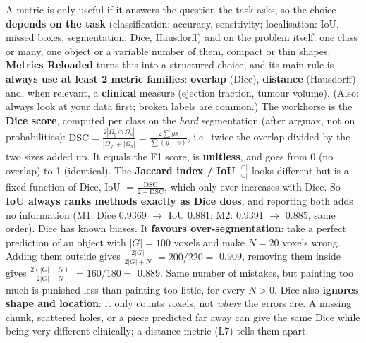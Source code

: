 \documentclass[a4paper]{article}
\newcommand{\K}[1]{\textcolor{kg}{\textbf{#1}}}
\newcommand{\F}[1]{\textcolor{fb}{#1}}
\newcommand{\E}[1]{\textcolor{ep}{#1}}
\newcommand{\T}[1]{\textcolor{tr}{\textbf{#1}}}
\newcommand{\ra}{\ensuremath{\to}}
\newcommand{\Om}{\Omega}
\begin{document}
A metric is only useful if it answers the question the task asks, so the choice \K{depends on the task} (classification: accuracy, sensitivity; localisation: IoU, missed boxes; segmentation: Dice, Hausdorff) and on the problem itself: one class or many, one object or a variable number of them, compact or thin shapes. \K{Metrics Reloaded} turns this into a structured choice, and its main rule is \T{always use at least 2 metric families}: \K{overlap} (Dice), \K{distance} (Hausdorff) and, when relevant, a \K{clinical} measure (\E{ejection fraction, tumour volume}). (Also: always look at your data first; broken labels are common.) The workhorse is the \K{Dice score}, computed per class on the \emph{hard} segmentation (after argmax, not on probabilities): \F{$\text{DSC}=\frac{2|\Om_y\cap\Om_s|}{|\Om_y|+|\Om_s|}=\frac{2\sum ys}{\sum(y+s)}$}, i.e.\ twice the overlap divided by the two sizes added up. It equals the F1 score, is \K{unitless}, and goes from 0 (no overlap) to 1 (identical). The \K{Jaccard index / IoU} \F{$\frac{|\cap|}{|\cup|}$} looks different but is a fixed function of Dice, \F{IoU $=\frac{\text{DSC}}{2-\text{DSC}}$}, which only ever increases with Dice. So \T{IoU always ranks methods exactly as Dice does}, and reporting both adds no information (\E{M1: Dice 0.9369 \ra{} IoU 0.881; M2: 0.9391 \ra{} 0.885, same order}).
Dice has known biases. It \T{favours over-segmentation}: take a perfect prediction of an object with $|G|=100$ voxels and make $N=20$ voxels wrong. Adding them outside gives \F{$\frac{2|G|}{2|G|+N}$} $=200/220=$ \E{0.909}, removing them inside gives \F{$\frac{2(|G|-N)}{2|G|-N}$} $=160/180=$ \E{0.889}. Same number of mistakes, but painting too much is punished less than painting too little, for every $N>0$.
Dice also \T{ignores shape and location}: it only counts voxels, not \emph{where} the errors are. A missing chunk, scattered holes, or a piece predicted far away can give the same Dice while being very different clinically; a distance metric (L7) tells them apart.
\end{document}
